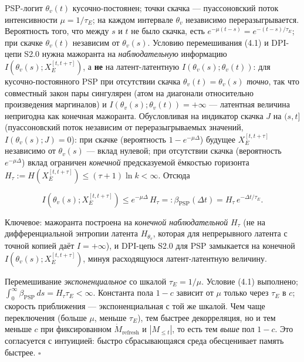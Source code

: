 \documentclass[12pt]{iopart}
\begin{document}
PSP-логит \(\theta_v(t)\) кусочно-постоянен; точки скачка --- пуассоновский поток интенсивности \(\mu = 1/\tau_E\); на каждом интервале \(\theta_v\) независимо переразыгрывается. Вероятность того, что между \(s\) и \(t\) не было скачка, есть \(e^{-\mu(t-s)} = e^{-(t-s)/\tau_E}\); при скачке \(\theta_v(t)\) независим от \(\theta_v(s)\). Условию перемешивания (4.1) и DPI-цепи S2.0 нужна мажоранта на \emph{наблюдательную} информацию \(I(\theta_v(s); X_E^{[t,t+\tau]})\), а \textbf{не} на латент-латентную \(I(\theta_v(s);\theta_v(t))\): для кусочно-постоянного PSP при отсутствии скачка \(\theta_v(t)=\theta_v(s)\) \emph{точно}, так что совместный закон пары сингулярен (атом на диагонали относительно произведения маргиналов) и \(I(\theta_v(s);\theta_v(t))=+\infty\) --- латентная величина непригодна как конечная мажоранта. Обусловливая на индикатор скачка \(J\) на \((s,t]\) (пуассоновский поток независим от переразыгрываемых значений, \(I(\theta_v(s);J)=0\)): при скачке (вероятность \(1-e^{-\mu\Delta}\)) будущее \(X_E^{[t,t+\tau]}\) независимо от \(\theta_v(s)\) --- вклад нулевой; при отсутствии скачка (вероятность \(e^{-\mu\Delta}\)) вклад ограничен \emph{конечной} предсказуемой ёмкостью горизонта \(H_\tau := H(X_E^{[t,t+\tau]}) \le (\tau+1)\ln k < \infty\). Отсюда



\begin{equation}I(\theta_v(s); X_E^{[t,t+\tau]}) \le e^{-\mu\Delta}\,H_\tau =: \beta_{\text{PSP}}(\Delta t) = H_\tau\,e^{-\Delta t/\tau_E}. \tag{S2.3}\end{equation}



Ключевое: мажоранта построена на \emph{конечной наблюдательной} \(H_\tau\) (не на дифференциальной энтропии латента \(H_{\theta_v}\), которая для непрерывного латента с точной копией даёт \(I=+\infty\)), и DPI-цепь S2.0 для PSP замыкается на конечной \(I(\theta_v(s);X_E^{[t,t+\tau]})\), минуя расходящуюся латент-латентную величину.



Перемешивание \emph{экспоненциальное} со шкалой \(\tau_E = 1/\mu\). Условие (4.1) выполнено; \(\int_0^\infty\beta_{\text{PSP}}\,ds = H_\tau\tau_E < \infty\). Константа пола \(1-c\) зависит от \(\mu\) только через \(\tau_E\) в \(c\); скорость приближения --- экспоненциальная с той же шкалой. Чем чаще переключения (больше \(\mu\), меньше \(\tau_E\)), тем быстрее декорреляция, но и тем меньше \(c\) при фиксированном \(\dot M_{\text{refresh}}\) и \(|M_{\le t}|\), то есть тем \emph{выше} пол \(1-c\). Это согласуется с интуицией: быстро сбрасывающаяся среда обесценивает память быстрее. \(\square\)
\end{document}
